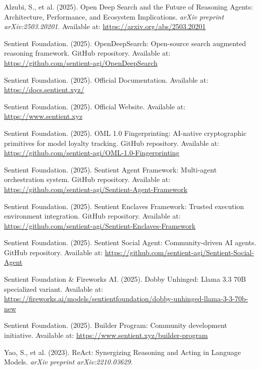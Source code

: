 \documentclass[12pt,a4paper]{article}
\begin{document}
\begin{thebibliography}{99}

Alzubi, S., et al. (2025). Open Deep Search and the Future of Reasoning Agents: Architecture, Performance, and Ecosystem Implications. \textit{arXiv preprint arXiv:2503.20201}. Available at: \url{https://arxiv.org/abs/2503.20201}

Sentient Foundation. (2025). OpenDeepSearch: Open-source search augmented reasoning framework. GitHub repository. Available at: \url{https://github.com/sentient-agi/OpenDeepSearch}

Sentient Foundation. (2025). Official Documentation. Available at: \url{https://docs.sentient.xyz/}

Sentient Foundation. (2025). Official Website. Available at: \url{https://www.sentient.xyz}

Sentient Foundation. (2025). OML 1.0 Fingerprinting: AI-native cryptographic primitives for model loyalty tracking. GitHub repository. Available at: \url{https://github.com/sentient-agi/OML-1.0-Fingerprinting}

Sentient Foundation. (2025). Sentient Agent Framework: Multi-agent orchestration system. GitHub repository. Available at: \url{https://github.com/sentient-agi/Sentient-Agent-Framework}

Sentient Foundation. (2025). Sentient Enclaves Framework: Trusted execution environment integration. GitHub repository. Available at: \url{https://github.com/sentient-agi/Sentient-Enclaves-Framework}

Sentient Foundation. (2025). Sentient Social Agent: Community-driven AI agents. GitHub repository. Available at: \url{https://github.com/sentient-agi/Sentient-Social-Agent}

Sentient Foundation \& Fireworks AI. (2025). Dobby Unhinged: Llama 3.3 70B specialized variant. Available at: \url{https://fireworks.ai/models/sentientfoundation/dobby-unhinged-llama-3-3-70b-new}

Sentient Foundation. (2025). Builder Program: Community development initiative. Available at: \url{https://www.sentient.xyz/builder-program}

Yao, S., et al. (2023). ReAct: Synergizing Reasoning and Acting in Language Models. \textit{arXiv preprint arXiv:2210.03629}.


\end{thebibliography}
\end{document}
